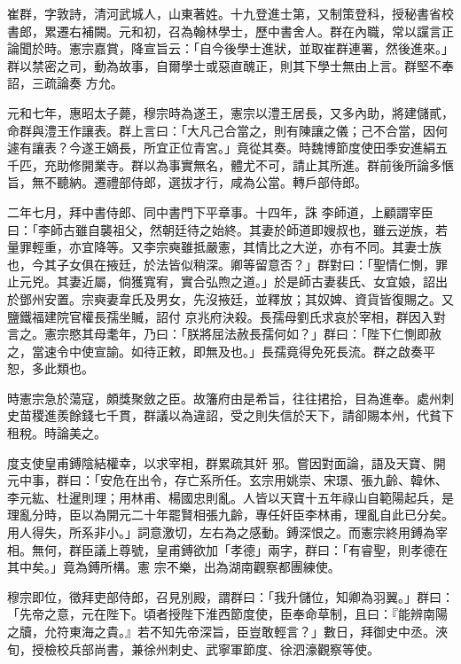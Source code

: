 \begin{pinyinscope}
 崔群，字敦詩，清河武城人，山東著姓。十九登進士第，又制策登科，授秘書省校書郎，累遷右補闕。元和初，召為翰林學士，歷中書舍人。群在內職，常以讜言正論聞於時。憲宗嘉賞，降宣旨云：「自今後學士進狀，並取崔群連署，然後進來。」群以禁密之司，動為故事，自爾學士或惡直醜正，則其下學士無由上言。群堅不奉詔，三疏論奏
 方允。



 元和七年，惠昭太子薨，穆宗時為遂王，憲宗以澧王居長，又多內助，將建儲貳，命群與澧王作讓表。群上言曰：「大凡己合當之，則有陳讓之儀；己不合當，因何遽有讓表？今遂王嫡長，所宜正位青宮。」竟從其奏。時魏博節度使田季安進絹五千匹，充助修開業寺。群以為事實無名，體尤不可，請止其所進。群前後所論多愜旨，無不聽納。遷禮部侍郎，選拔才行，咸為公當。轉戶部侍郎。



 二年七月，拜中書侍郎、同中書門下平章事。十四年，誅
 李師道，上顧謂宰臣曰：「李師古雖自襲祖父，然朝廷待之始終。其妻於師道即嫂叔也，雖云逆族，若量罪輕重，亦宜降等。又李宗奭雖抵嚴憲，其情比之大逆，亦有不同。其妻士族也，今其子女俱在掖廷，於法皆似稍深。卿等留意否？」群對曰：「聖情仁惻，罪止元兇。其妻近屬，倘獲寬宥，實合弘煦之道。」於是師古妻裴氏、女宜娘，詔出於鄧州安置。宗奭妻韋氏及男女，先沒掖廷，並釋放；其奴婢、資貨皆復賜之。又鹽鐵福建院官權長孺坐贓，詔付
 京兆府決殺。長孺母劉氏求哀於宰相，群因入對言之。憲宗愍其母耄年，乃曰：「朕將屈法赦長孺何如？」群曰：「陛下仁惻即赦之，當速令中使宣諭。如待正敕，即無及也。」長孺竟得免死長流。群之啟奏平恕，多此類也。



 時憲宗急於蕩寇，頗獎聚斂之臣。故籓府由是希旨，往往捃拾，目為進奉。處州刺史苗稷進羨餘錢七千貫，群議以為違詔，受之則失信於天下，請卻賜本州，代貧下租稅。時論美之。



 度支使皇甫鎛陰結權幸，以求宰相，群累疏其奸
 邪。嘗因對面論，語及天寶、開元中事，群曰：「安危在出令，存亡系所任。玄宗用姚崇、宋璟、張九齡、韓休、李元紘、杜暹則理；用林甫、楊國忠則亂。人皆以天寶十五年祿山自範陽起兵，是理亂分時，臣以為開元二十年罷賢相張九齡，專任奸臣李林甫，理亂自此已分矣。用人得失，所系非小。」詞意激切，左右為之感動。鎛深恨之。而憲宗終用鎛為宰相。無何，群臣議上尊號，皇甫鎛欲加「孝德」兩字，群曰：「有睿聖，則孝德在其中矣。」竟為鎛所構。憲
 宗不樂，出為湖南觀察都團練使。



 穆宗即位，徵拜吏部侍郎，召見別殿，謂群曰：「我升儲位，知卿為羽翼。」群曰：「先帝之意，元在陛下。頃者授陛下淮西節度使，臣奉命草制，且曰：『能辨南陽之牘，允符東海之貴。』若不知先帝深旨，臣豈敢輕言？」數日，拜御史中丞。浹旬，授檢校兵部尚書，兼徐州刺史、武寧軍節度、徐泗濠觀察等使。




\end{pinyinscope}
